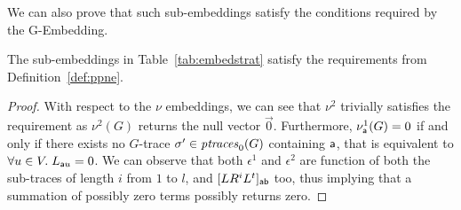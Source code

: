 {We can also prove that such sub-embeddings satisfy the conditions required by the G-Embedding. }
\begin{lemma}\label{lem:addedForOurPropos}
	{The sub-embeddings in Table~\ref{tab:embedstrat} satisfy the requirements from Definition~\ref{def:ppne}.}
\end{lemma}
\begin{proof}
	{With respect to the $\nu$ embeddings, we can see that $\nu^2$ trivially satisfies the requirement as $\nu^2(G)$ returns the null vector $\vec{0}$. Furthermore, $\nu^1_\const{a}(G)=0$ if and only if there exists no $G$-trace  $\nonlogtrace\in\ptraces{G}{0}$ containing $\const{a}$, that is equivalent to  $\forall u\in V.\;L_{\const{a}u}=0$. We can observe that both $\epsilon^1$ and $\epsilon^2$ are function of both the sub-traces of length $i$ from $1$ to $l$, and  $[LR^iL^t]_\const{ab}$ too, thus implying that a summation of possibly zero terms possibly returns zero.}
\end{proof}


